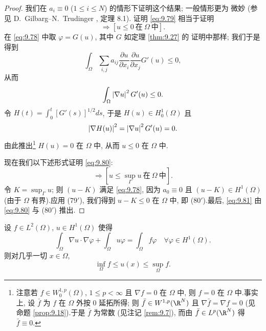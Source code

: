 \begin{proof}
我们在 $a_i\equiv0$ ($1\le i\le N$) 的情形下证明这个结果; 一般情形更为
微妙 (参见 D.~Gilbarg--N.~Trudinger , 定理 8.1).
证明 \eqref{eq:9.79} 相当于证明
\begin{equation*}
[u\le0\ \text{在}\ \Gamma\ \text{上且}\ f\le0\ \text{在}\ \Omega\ \text{中}]
\Rightarrow[u\le0\ \text{在}\ \Omega\ \text{中}].
\tag*{(79$'$)}
\end{equation*}
在 \eqref{eq:9.78} 中取 $\varphi=G(u)$, 其中 $G$ 如定理  \ref{thm:9.27} 的
证明中那样; 我们于是得到
\begin{equation*}
\int_\Omega\sum_{i,j}a_{ij}\frac{\partial u}{\partial x_i}
\frac{\partial u}{\partial x_j}G'(u)\le0,
\end{equation*}
从而
\begin{equation*}
\int_\Omega\left|\nabla u\right|^2G'(u)\le0.
\end{equation*}
令 $H(t)=\int_0^t[G'(s)]^{1/2}ds$, 于是 $H(u)\in H_0^1(\Omega)$ 且
\begin{equation*}
\left|\nabla H(u)\right|^2=\left|\nabla u\right|^2G'(u)=0.
\end{equation*}
由此推出\footnote{注意若 $f\in W_0^{1,p}(\Omega)$, $1\le p<\infty$ 且
$\nabla f=0$ 在 $\Omega$ 中, 则 $f=0$ 在 $\Omega$ 中.事实上, 设 $\bar f$
为 $f$ 在 $\Omega$ 外按 $0$ 延拓所得; 则 $\bar f\in W^{1,p}(\R^N)$ 且
$\nabla\bar f=\nabla f=0$ (见命题  \ref{prop:9.18}).于是 $\bar f$ 为常数
(见注记 \ref{rem:9.7}), 而由 $\bar f\in L^p(\R^N)$ 得
$\bar f\equiv0$.} $H(u)=0$ 在 $\Omega$ 中, 从而 $u\le0$ 在 $\Omega$ 中.

现在我们以下述形式证明 \eqref{eq:9.80}:
\begin{equation*}
[f\le0\ \text{在}\ \Omega\ \text{中}]
\Rightarrow\left[u\le\sup_\Gamma u\ \text{在}\ \Omega\ \text{中}\right].
\tag*{(80$'$)}
\end{equation*}
令 $K=\sup_\Gamma u$; 则 $(u-K)$ 满足 \eqref{eq:9.78}, 因为 $a_0\equiv0$
且 $(u-K)\in H^1(\Omega)$ (由于 $\Omega$ 有界).应用
(79$'$), 我们得到 $u-K\le0$ 在 $\Omega$ 中, 即
(80$'$).最后, \eqref{eq:9.81} 由 \eqref{eq:9.80} 与
(80$'$) 推出.
\end{proof}

\begin{proposition}
\label{prop:9.30}
设 $f\in L^2(\Omega)$, $u\in H^1(\Omega)$ 使得
\begin{equation*}
\int_\Omega\nabla u\cdot\nabla\varphi+\int_\Omega u\varphi
=\int_\Omega f\varphi\quad\forall\varphi\in H^1(\Omega).
\end{equation*}
则对几乎一切 $x\in\Omega$,
\begin{equation*}
\inf_\Omega f\le u(x)\le\sup_\Omega f.
\end{equation*}
\end{proposition}

